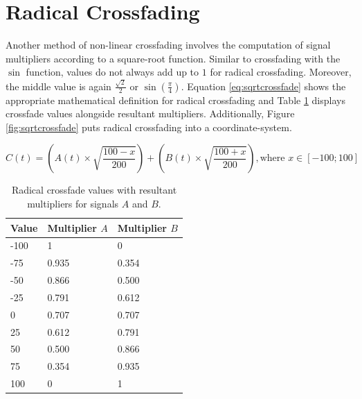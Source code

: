 \documentclass[12pt,twoside]{report}
\begin{document}
\section{Radical Crossfading}

Another method of non-linear crossfading involves the computation of signal multipliers according to a square-root function. Similar to crossfading with the $\sin$ function, values do not always add up to $1$ for radical crossfading. Moreover, the middle value is again $\frac{\sqrt{2}}{2}$ or $\sin(\frac{\pi}{4})$. Equation \ref{eq:sqrtcrossfade} shows the appropriate mathematical definition for radical crossfading and Table \ref{tb:sqrtcrossfade} displays crossfade values alongside resultant multipliers. Additionally, Figure \ref{fig:sqrtcrossfade} puts radical crossfading into a coordinate-system.

\begin{equation}
  C(t) = (A(t) \times \sqrt{\frac{100 - x}{200}}) + (B(t) \times \sqrt{\frac{100 + x}{200}}), \text{where } x \in [-100;100]
  \label{eq:sqrtcrossfade}
\end{equation}

\begin{table}[ht!]

  \centering

  \begin{tabular}[]{| l | l | l |}
    \hline
    \rowcolor[gray]{0.8}
    Value & Multiplier $A$ & Multiplier $B$ \\\hline
    -100 & 1 & 0\\\hline
    -75 & 0.935 & 0.354\\\hline
    -50 & 0.866 & 0.500\\\hline
    -25 & 0.791 & 0.612\\\hline
    0 & 0.707 & 0.707\\\hline
    25 & 0.612 & 0.791\\\hline
    50 & 0.500 & 0.866\\\hline
    75 & 0.354 & 0.935\\\hline
    100 & 0 & 1\\
    \hline
  \end{tabular}

  \caption{Radical crossfade values with resultant multipliers for signals $A$ and $B$.}

  \label{tb:sqrtcrossfade}

\end{table}
\end{document}
